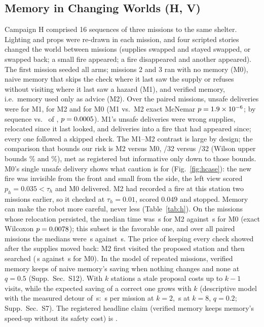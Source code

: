 \documentclass[conference]{IEEEtran}
\newcommand{\tauh}{\tau_{h}}
\begin{document}
\subsection{Memory in Changing Worlds (H, V)}\label{sec:res-h}
Campaign H comprised 16 sequences of three missions to the same shelter. Lighting and props were re-drawn in each mission, and four scripted stories changed the world between missions (supplies swapped and stayed swapped, or swapped back; a small fire appeared; a fire disappeared and another appeared). The first mission seeded all arms; missions 2 and 3 ran with no memory (M0), naive memory that skips the check where it last saw the supply or refuses without visiting where it last saw a hazard (M1), and verified memory, i.e.\ memory used only as advice (M2).
Over the \HPTwoN{} paired missions, unsafe deliveries were \HUnsafeMone{} for M1, \HUnsafeMtwo{} for M2 and \HUnsafeMzero{} for M0 (M1 vs.\ M2 exact McNemar $p=1.9\times10^{-6}$; by sequence \HSeqMone{} vs.\ \HSeqMtwo{} of \HSeqN, $p=0.0005$). M1's unsafe deliveries were \HWrongone{} wrong supplies, relocated since it last looked, and \HFireone{} deliveries into a fire that had appeared since; every one followed a skipped check. The M1--M2 contrast is large by design; the comparison that bounds our risk is M2 versus M0, \HUnsafeMtwo/32 versus \HUnsafeMzero/32 (Wilson upper bounds \HUnsafeUppertwo\% and \HUnsafeUpperzero\%), met as registered but informative only down to those bounds. M0's single unsafe delivery shows what caution is for (Fig.~\ref{fig:hcase}): the new fire was invisible from the front and small from the side, the left view scored $p_h=0.035<\tauh$ and M0 delivered. M2 had recorded a fire at this station two missions earlier, so it checked at $\tauh=0.01$, scored $0.049$ and stopped. Memory can make the robot more careful, never less (Table~\ref{tab:h}).
On the \HPOneN{} missions whose relocation persisted, the median time was \HTimeMtwo\,s for M2 against \HTimeMzero\,s for M0 (exact Wilcoxon $p=0.0078$); this subset is the favorable one, and over all \HPTwoN{} paired missions the medians were \HTimeAlltwo\,s against \HTimeAllzero\,s. The price of keeping every check showed after the supplies moved back: M2 first visited the proposed station and then searched (\HChangeMtwo\,s against \HChangeMzero\,s for M0). In the model of repeated missions, verified memory keeps \HPriceFracZero{} of naive memory's saving when nothing changes and none at $q=0.5$ (Supp.~Sec.~S12). With $k$ stations a stale proposal costs up to $k-1$ visits, while the expected saving of a correct one grows with $k$ (descriptive model with the measured detour of \HKDelta\,s: \HKSaveTwo\,s per mission at $k=2$, \HKSaveEight\,s at $k=8$, $q=0.2$; Supp.~Sec.~S7). The registered headline claim (verified memory keeps memory's speed-up without its safety cost) is \HHeadline.
\end{document}
